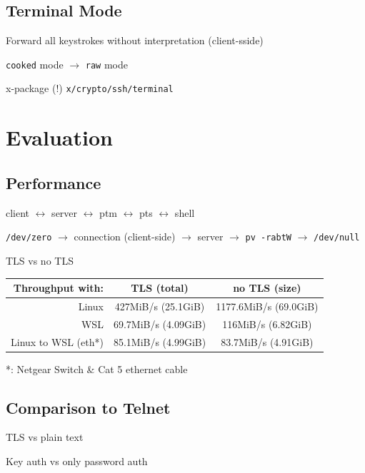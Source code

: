 \documentclass[
	xcolor=dvipsnames,
	handout
]{beamer}
\newenvironment{zhawframe}[1][]
{\begin{frame}[environment=fr,#1]{\insertsubsectionhead}{\insertsectionhead}}
{\end{frame}
}
\begin{document}
\subsection{Terminal Mode}
\begin{zhawframe}
 Forward all keystrokes without interpretation (client-sside)

 \texttt{cooked} mode $\rightarrow$ \texttt{raw} mode

 x-package (!) \texttt{x/crypto/ssh/terminal}
\end{zhawframe}

\section{Evaluation}
\subsection{Performance}
\begin{zhawframe}
 client \textcolor{green!60!blue}{$\leftrightarrow$} server $\leftrightarrow$ ptm $\leftrightarrow$ pts $\leftrightarrow$ shell

 \texttt{/dev/zero} $\rightarrow$ connection (client-side) $\rightarrow$ server $\rightarrow$ \texttt{pv -rabtW} $\rightarrow$ \texttt{/dev/null}

 TLS vs no TLS

\begin{table}[ht]
\centering
\begin{tabular}{rcc}
Throughput with:		& TLS (total)	& no TLS (size)\\\hline
Linux 					& 427MiB/s (25.1GiB)	& 1177.6MiB/s (69.0GiB)\\
WSL 					& 69.7MiB/s (4.09GiB)	& 116MiB/s (6.82GiB)\\
Linux to WSL (eth*) 	& 85.1MiB/s (4.99GiB)	& 83.7MiB/s (4.91GiB)
\end{tabular}
\end{table}
 *: Netgear Switch \& Cat 5 ethernet cable
\end{zhawframe}

\subsection{Comparison to Telnet}
\begin{zhawframe}
 TLS vs plain text

 Key auth vs only password auth
\end{zhawframe}
\end{document}

